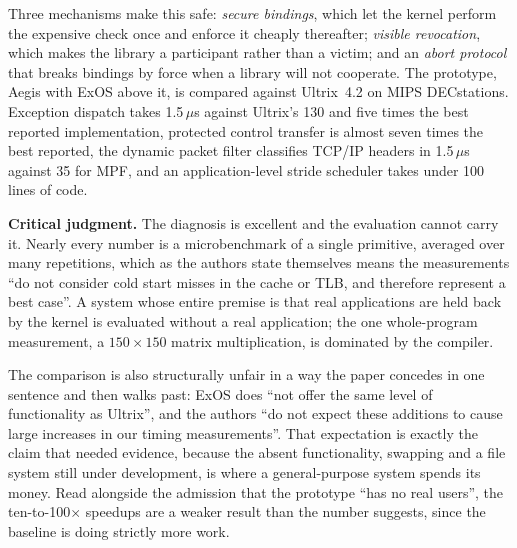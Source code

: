 Three mechanisms make this safe: \emph{secure bindings}, which let the kernel perform the
expensive check once and enforce it cheaply thereafter; \emph{visible revocation}, which
makes the library a participant rather than a victim; and an \emph{abort protocol} that
breaks bindings by force when a library will not cooperate. The prototype, Aegis with
ExOS above it, is compared against Ultrix~4.2 on MIPS DECstations. Exception dispatch
takes 1.5\,$\mu$s against Ultrix's 130 and five times the best reported implementation,
protected control transfer is almost seven times the best reported, the dynamic packet
filter classifies TCP/IP headers in 1.5\,$\mu$s against 35 for MPF, and an
application-level stride scheduler takes under 100 lines of code.

\textbf{Critical judgment.}
The diagnosis is excellent and the evaluation cannot carry it. Nearly every number is a
microbenchmark of a single primitive, averaged over many repetitions, which as the authors
state themselves means the measurements ``do not consider cold start misses in the cache
or TLB, and therefore represent a best case''. A system whose entire premise is that real
applications are held back by the kernel is evaluated without a real application; the one
whole-program measurement, a $150\times150$ matrix multiplication, is dominated by the
compiler.

The comparison is also structurally unfair in a way the paper concedes in one sentence and
then walks past: ExOS does ``not offer the same level of functionality as Ultrix'', and the
authors ``do not expect these additions to cause large increases in our timing
measurements''. That expectation is exactly the claim that needed evidence, because the
absent functionality, swapping and a file system still under development, is where a
general-purpose system spends its money. Read alongside the admission that the prototype
``has no real users'', the ten-to-100$\times$ speedups are a weaker result than the number
suggests, since the baseline is doing strictly more work.

